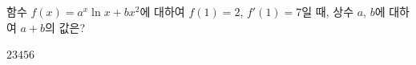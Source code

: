 함수 $f(x)=a^x\ln x+bx^2$에 대하여 $f(1)=2$, $f'(1)=7$일 때, 상수 $a$, $b$에 대하여 $a+b$의 값은? 
\begin{choices32}{$2$}{$3$}{$4$}{$5$}{$6$}\end{choices32}
